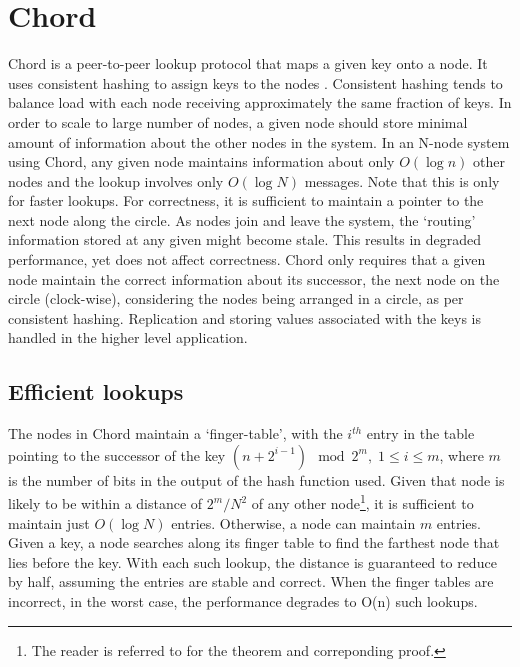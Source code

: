 \documentclass{sig-alternate-10pt}
\begin{document}
\section{Chord} 
Chord is a peer-to-peer lookup protocol that maps a given key onto a node. It uses consistent hashing \cite{consistent-hashing} to assign keys to the nodes \cite{chord}. Consistent hashing tends to balance load with each node receiving approximately the same fraction of keys. In order to scale to large number of nodes, a given node should store minimal amount of information about the other nodes in the system. In an N-node system using Chord, any given node maintains information about only $O(\log n)$ other nodes and the lookup involves only $O(\log N)$ messages. Note that this is only for faster lookups. For correctness, it is sufficient to maintain a pointer to the next node along the circle.
As nodes join and leave the system, the `routing' information stored at any given might become stale. This results in degraded performance, yet does not affect correctness. Chord only requires that a given node maintain the correct information about its successor, the next node on the circle (clock-wise), considering the nodes being arranged in a circle, as per consistent hashing. Replication and storing values associated with the keys is handled in the higher level application.
\subsection{Efficient lookups}
The nodes in Chord maintain a `finger-table', with the $i^{th}$ entry in the table pointing to the successor of the key $(n + 2^{i - 1}) \mod 2^m, \; 1 \leq i \leq m$, where $m$ is the number of bits in the output of the hash function used. Given that node is likely to be within a distance of $2^m/N^2$ of any other node\footnote{The reader is referred to \cite{chord} for the theorem and correponding proof.}, it is sufficient to maintain just $O (\log N)$ entries. Otherwise, a node can maintain $m$ entries. Given a key, a node searches along its finger table to find the farthest node that lies before the key. With each such lookup, the distance is guaranteed to reduce by half, assuming the entries are stable and correct. When the finger tables are incorrect, in the worst case, the performance degrades to O(n) such lookups.
\end{document}
